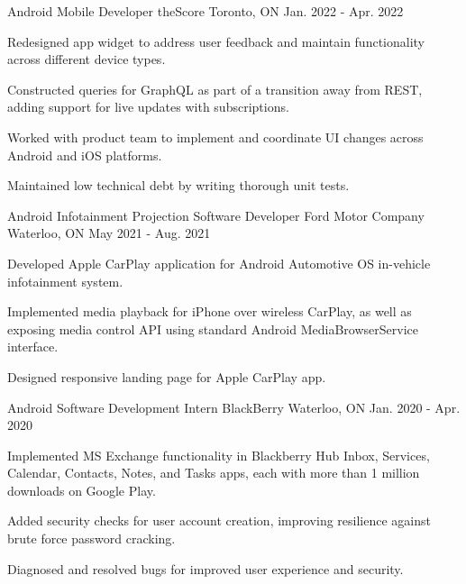 \begin{cventries}
  \cventry
    {Android Mobile Developer} %
    {theScore} %
    {Toronto, ON} %
    {Jan. 2022 - Apr. 2022} %
    {
      \begin{cvitems} %
        \item {Redesigned app widget to address user feedback and maintain functionality across different device types.}
        \item {Constructed queries for GraphQL as part of a transition away from REST, adding support for live updates with subscriptions.}
        \item {Worked with product team to implement and coordinate UI changes across Android and iOS platforms.}
        \item {Maintained low technical debt by writing thorough unit tests.}
      \end{cvitems}
    }

  \cventry
    {Android Infotainment Projection Software Developer} %
    {Ford Motor Company} %
    {Waterloo, ON} %
    {May 2021 - Aug. 2021} %
    {
      \begin{cvitems} %
        \item {Developed Apple CarPlay application for Android Automotive OS in-vehicle infotainment system.}
        \item {Implemented media playback for iPhone over wireless CarPlay, as well as exposing media control API using standard Android MediaBrowserService interface.}
        \item {Designed responsive landing page for Apple CarPlay app.}
      \end{cvitems}
    }

  \cventry
    {Android Software Development Intern} %
    {BlackBerry} %
    {Waterloo, ON} %
    {Jan. 2020 - Apr. 2020} %
    {
      \begin{cvitems} %
        \item {Implemented MS Exchange functionality in Blackberry Hub Inbox, Services, Calendar, Contacts, Notes, and Tasks apps, each with more than 1 million downloads on Google Play.}
        \item {Added security checks for user account creation, improving resilience against brute force password cracking.}
        \item {Diagnosed and resolved bugs for improved user experience and security.}
      \end{cvitems}
    }

\end{cventries}
